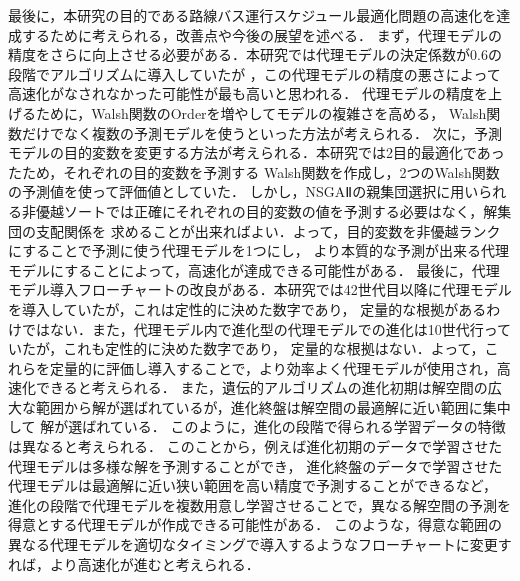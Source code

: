 \documentclass[main]{subfiles}
\begin{document}
最後に，本研究の目的である路線バス運行スケジュール最適化問題の高速化を達成するために考えられる，改善点や今後の展望を述べる．
まず，代理モデルの精度をさらに向上させる必要がある．本研究では代理モデルの決定係数が0.6の段階でアルゴリズムに導入していたが
，この代理モデルの精度の悪さによって高速化がなされなかった可能性が最も高いと思われる．
代理モデルの精度を上げるために，Walsh関数のOrderを増やしてモデルの複雑さを高める，
Walsh関数だけでなく複数の予測モデルを使うといった方法が考えられる．
次に，予測モデルの目的変数を変更する方法が考えられる．本研究では2目的最適化であったため，それぞれの目的変数を予測する
Walsh関数を作成し，2つのWalsh関数の予測値を使って評価値としていた．
しかし，NSGAⅡの親集団選択に用いられる非優越ソートでは正確にそれぞれの目的変数の値を予測する必要はなく，解集団の支配関係を
求めることが出来ればよい．よって，目的変数を非優越ランクにすることで予測に使う代理モデルを1つにし，
より本質的な予測が出来る代理モデルにすることによって，高速化が達成できる可能性がある．
最後に，代理モデル導入フローチャートの改良がある．本研究では42世代目以降に代理モデルを導入していたが，これは定性的に決めた数字であり，
定量的な根拠があるわけではない．また，代理モデル内で進化型の代理モデルでの進化は10世代行っていたが，これも定性的に決めた数字であり，
定量的な根拠はない．よって，これらを定量的に評価し導入することで，より効率よく代理モデルが使用され，高速化できると考えられる．
また，遺伝的アルゴリズムの進化初期は解空間の広大な範囲から解が選ばれているが，進化終盤は解空間の最適解に近い範囲に集中して
解が選ばれている．
このように，進化の段階で得られる学習データの特徴は異なると考えられる．
このことから，例えば進化初期のデータで学習させた代理モデルは多様な解を予測することができ，
進化終盤のデータで学習させた代理モデルは最適解に近い狭い範囲を高い精度で予測することができるなど，
進化の段階で代理モデルを複数用意し学習させることで，異なる解空間の予測を得意とする代理モデルが作成できる可能性がある．
このような，得意な範囲の異なる代理モデルを適切なタイミングで導入するようなフローチャートに変更すれば，より高速化が進むと考えられる．
\end{document}
